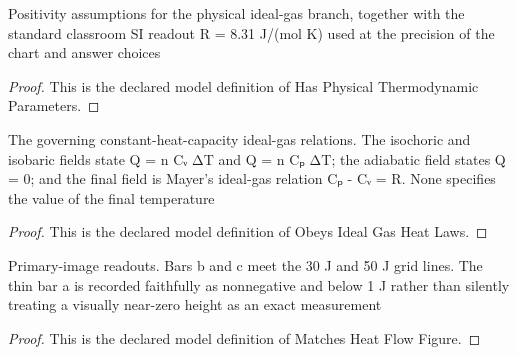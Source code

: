 \begin{definition}
  \label{def:physics:phyx-mini-0346:phyxminiproblems-problemphyxmini0346-hasphysicalthermodynamicparameters}
  Positivity assumptions for the physical ideal-gas branch, together with the standard classroom SI readout R = 8.31 J/(mol K) used at the precision of the chart and answer choices
\end{definition}
\begin{proof}
  This is the declared model definition of Has Physical Thermodynamic Parameters.
\end{proof}
\begin{definition}
  \label{def:physics:phyx-mini-0346:phyxminiproblems-problemphyxmini0346-obeysidealgasheatlaws}
  The governing constant-heat-capacity ideal-gas relations. The isochoric and isobaric fields state Q = n Cᵥ ΔT and Q = n Cₚ ΔT; the adiabatic field states Q = 0; and the final field is Mayer's ideal-gas relation Cₚ - Cᵥ = R. None specifies the value of the final temperature
\end{definition}
\begin{proof}
  This is the declared model definition of Obeys Ideal Gas Heat Laws.
\end{proof}
\begin{definition}
  \label{def:physics:phyx-mini-0346:phyxminiproblems-problemphyxmini0346-matchesheatflowfigure}
  Primary-image readouts. Bars b and c meet the 30 J and 50 J grid lines. The thin bar a is recorded faithfully as nonnegative and below 1 J rather than silently treating a visually near-zero height as an exact measurement
\end{definition}
\begin{proof}
  This is the declared model definition of Matches Heat Flow Figure.
\end{proof}

